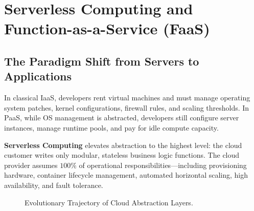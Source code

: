 \documentclass[11pt,a4paper,openany]{report}
\begin{document}
\section{Serverless Computing and Function-as-a-Service (FaaS)}
\subsection{The Paradigm Shift from Servers to Applications}
In classical IaaS, developers rent virtual machines and must manage operating system patches, kernel configurations, firewall rules, and scaling thresholds. In PaaS, while OS management is abstracted, developers still configure server instances, manage runtime pools, and pay for idle compute capacity.

\textbf{Serverless Computing} elevates abstraction to the highest level: the cloud customer writes only modular, stateless business logic functions. The cloud provider assumes $100\%$ of operational responsibilities---including provisioning hardware, container lifecycle management, automated horizontal scaling, high availability, and fault tolerance.

\begin{figure}[H]
\centering
{}
\caption{Evolutionary Trajectory of Cloud Abstraction Layers.}
\end{figure}
\end{document}
